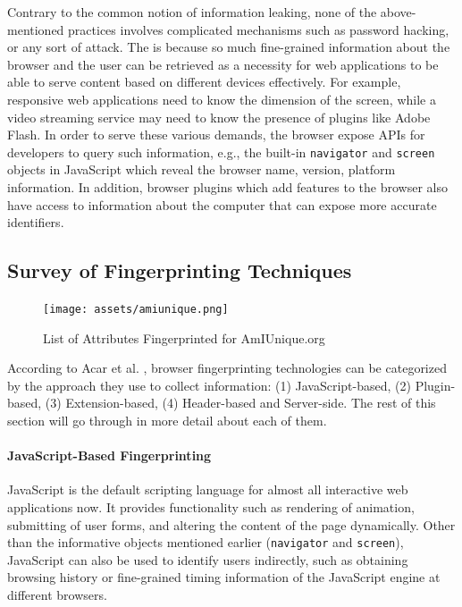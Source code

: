 \documentclass{acm_proc_article-sp}
\begin{document}
Contrary to the common notion of information leaking, none of the above-mentioned practices involves complicated mechanisms such as password hacking, or any sort of attack. The is because so much fine-grained information about the browser and the user can be retrieved as a necessity for web applications to be able to serve content based on different devices effectively. For example, responsive web applications need to know the dimension of the screen, while a video streaming service may need to know the presence of plugins like Adobe Flash. 
In order to serve these various demands, the browser expose APIs for developers to query such information, e.g., the built-in \verb|navigator| and \verb|screen| objects in JavaScript which reveal the browser name, version, platform information. 
In addition, browser plugins which add  features to the browser also have access to information about the computer that can expose more accurate identifiers.

\subsection{Survey of Fingerprinting Techniques}

\begin{figure}[h]
    \centering
    \texttt{[image: assets/amiunique.png]}
    \caption{List of Attributes Fingerprinted for AmIUnique.org}
    \label{fig:amiunique}
\end{figure}


According to Acar et al. \cite{acar:fpd}, browser fingerprinting technologies can be categorized by the approach they use to collect information: (1) JavaScript-based, (2) Plugin-based, (3) Extension-based, (4) Header-based and Server-side.
The rest of this section will go through in more detail about each of them.

\paragraph{JavaScript-Based Fingerprinting}
JavaScript is the default scripting language for almost all interactive web applications now. It provides functionality such as rendering of animation, submitting of user forms, and altering the content of the page dynamically. 
Other than the informative objects mentioned earlier (\verb|navigator| and \verb|screen|), JavaScript can also be used to identify users indirectly, such as obtaining browsing history or fine-grained timing information of the JavaScript engine at different browsers.
\end{document}
